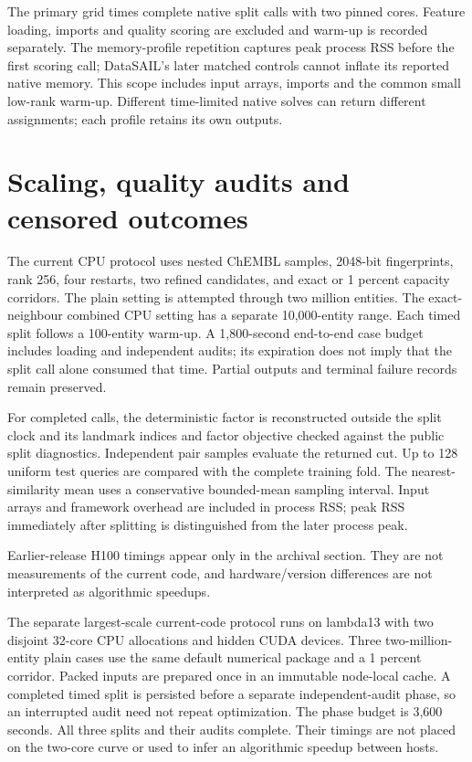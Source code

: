 \documentclass[12pt]{article}
\begin{document}
The primary grid times complete native split calls with two pinned cores.
Feature loading, imports and quality scoring are excluded and warm-up is
recorded separately. The memory-profile repetition captures peak process RSS
before the first scoring call; DataSAIL's later matched controls cannot inflate
its reported native memory. This scope includes input arrays, imports and the
common small low-rank warm-up. Different time-limited native solves can return
different assignments; each profile retains its own outputs.



\section{Scaling, quality audits and censored outcomes}

The current CPU protocol uses nested ChEMBL samples, 2048-bit fingerprints,
rank 256, four restarts, two refined candidates, and exact or 1 percent
capacity corridors. The plain setting is attempted through two million entities.
The exact-neighbour combined CPU setting has a separate 10,000-entity range.
Each timed split follows a 100-entity warm-up. A 1,800-second end-to-end case
budget includes loading and independent audits; its expiration does not imply
that the split call alone consumed that time. Partial outputs and terminal
failure records remain preserved.

For completed calls, the deterministic factor is reconstructed outside the
split clock and its landmark indices and factor objective checked against the
public split diagnostics. Independent pair samples evaluate the returned cut.
Up to 128 uniform test queries are compared with the complete training fold.
The nearest-similarity mean uses a conservative bounded-mean sampling interval.
Input arrays and framework overhead are included in process RSS; peak RSS
immediately after splitting is distinguished from the later process peak.



Earlier-release H100 timings appear only in the archival section. They are not
measurements of the current code, and hardware/version differences are not
interpreted as algorithmic speedups.

The separate largest-scale current-code protocol runs on lambda13 with two
disjoint 32-core CPU allocations and hidden CUDA devices. Three two-million-entity
plain cases use the same default numerical package and a 1 percent corridor.
Packed inputs are prepared once in an immutable node-local cache. A completed
timed split is persisted before a separate independent-audit phase, so an
interrupted audit need not repeat optimization. The phase budget is 3,600 seconds.
All three splits and their audits complete. Their timings are not placed on the
two-core curve or used to infer an algorithmic speedup between hosts.
\end{document}
